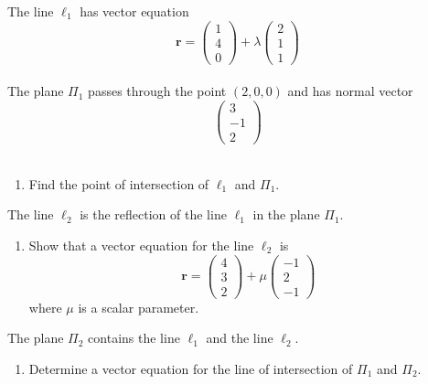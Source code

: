 \documentclass[leqno]{article}
\begin{document}
\begin{enumerate}[
  label=\textbf{\arabic*.},
  leftmargin=*,
  topsep=0pt,
  partopsep=0pt,
  parsep=0pt
]
\newpage

\questionitem

The line $\ell_1$ has vector equation
\[
\mathbf{r}=\begin{pmatrix}1\\4\\0\end{pmatrix}+\lambda\begin{pmatrix}2\\1\\1\end{pmatrix}
\] \\
The plane $\Pi_1$ passes through the point $(2,0,0)$ and has normal vector
\[
\begin{pmatrix}3\\-1\\2\end{pmatrix}
\] \\
\begin{enumerate}[label=\textbf{(\alph*)}]
  \item Find the point of intersection of $\ell_1$ and $\Pi_1$.  \\
\end{enumerate}
The line $\ell_2$ is the reflection of the line $\ell_1$ in the plane $\Pi_1$. \\
\begin{enumerate}[label=\textbf{(\alph*)}, resume]
  \item Show that a vector equation for the line $\ell_2$ is
  \[
  \mathbf{r}=\begin{pmatrix}4\\3\\2\end{pmatrix}+\mu\begin{pmatrix}-1\\2\\-1\end{pmatrix}
  \]
  where $\mu$ is a scalar parameter. \\
\end{enumerate}
The plane $\Pi_2$ contains the line $\ell_1$ and the line $\ell_2$. \\
\begin{enumerate}[label=\textbf{(\alph*)}, resume]
  \item Determine a vector equation for the line of intersection of $\Pi_1$ and $\Pi_2$.  \\
\end{enumerate}


\end{enumerate}
\end{document}
